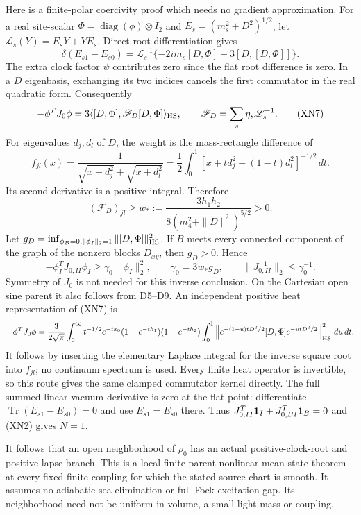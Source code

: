 \documentclass[11pt]{article}
\DeclareMathOperator{\Tr}{Tr}
\DeclareMathOperator{\diag}{diag}
\begin{document}
Here is a finite-polar coercivity proof which needs no gradient
approximation.  For a real site-scalar $\Phi=\diag(\phi)\otimes I_2$
and $E_s=(m_s^2+D^2)^{1/2}$, let
$\mathscr L_s(Y)=E_sY+YE_s$.  Direct root differentiation gives
\begin{equation}
 \delta(E_{s1}-E_{s0})
  =\mathscr L_s^{-1}
          \{-2im_s[D,\Phi]-3[D,[D,\Phi]]\}.
 \tag{XN6}
\end{equation}
The extra clock factor $\psi$ contributes zero since the flat root
difference is zero.  In a $D$ eigenbasis, exchanging its two indices
cancels the first commutator in the real quadratic form.  Consequently
\begin{equation}
 -\phi^T J_0\phi
   =3\langle[D,\Phi],\mathscr F_D[D,\Phi]\rangle_{\rm HS},
 \qquad \mathscr F_D=\sum_s\eta_s\mathscr L_s^{-1}.
 \tag{XN7}
\end{equation}
For eigenvalues $d_j,d_l$ of $D$, the weight is the mass-rectangle
difference of
\[
 f_{jl}(x)=\frac1{\sqrt{x+d_j^2}+\sqrt{x+d_l^2}}
   =\frac12\int_0^1[x+td_j^2+(1-t)d_l^2]^{-1/2}\,dt .
\]
Its second derivative is a positive integral.  Therefore
\[
 (\mathscr F_D)_{jl}\geq
   w_*:=\frac{3h_1h_2}{8(m_4^2+\|D\|^2)^{5/2}}>0 .
\]
Let
$g_D=\inf_{\phi_B=0,\|\phi_I\|_2=1}\|[D,\Phi]\|_{\rm HS}^2$.
If $B$ meets every connected component of the graph of the nonzero
blocks $D_{xy}$, then $g_D>0$.  Hence
\begin{equation}
 -\phi_I^T J_{0,II}\phi_I\geq
       \gamma_0\|\phi_I\|_2^2,\qquad
 \gamma_0=3w_*g_D,\qquad
 \|J_{0,II}^{-1}\|_2\leq\gamma_0^{-1}.
 \tag{XN8}
\end{equation}
Symmetry of $J_0$ is not needed for this inverse conclusion.
On the Cartesian open sine parent it also follows from D5--D9.
An independent positive heat representation of (XN7) is
\[
 -\phi^TJ_0\phi=\frac3{2\sqrt\pi}\int_0^\infty
 t^{-1/2}e^{-tx_0}(1-e^{-th_1})(1-e^{-th_2})
 \int_0^1
 \left\|e^{-(1-u)tD^2/2}[D,\Phi]e^{-utD^2/2}\right\|_{\rm HS}^2
 \,du\,dt .
\]
It follows by inserting the elementary Laplace integral for the
inverse square root into $f_{jl}$; no continuum spectrum is used.
Every finite heat operator is invertible, so this route gives the
same clamped commutator kernel directly.
The full summed linear vacuum derivative is zero at the flat point:
differentiate $\Tr(E_{s1}-E_{s0})=0$ and use $E_{s1}=E_{s0}$ there.
Thus $J_{0,II}^T{\bf1}_I+J_{0,BI}^T{\bf1}_B=0$ and (XN2) gives $N=1$.

It follows that an open neighborhood of $\rho_0$ has an actual
positive-clock-root and positive-lapse branch.  This is a local
finite-parent nonlinear mean-state theorem at every fixed finite
coupling for which the stated source chart is smooth.  It assumes no
adiabatic sea elimination or full-Fock excitation gap.  Its
neighborhood need not be uniform in volume, a small light mass or
coupling.
\end{document}
